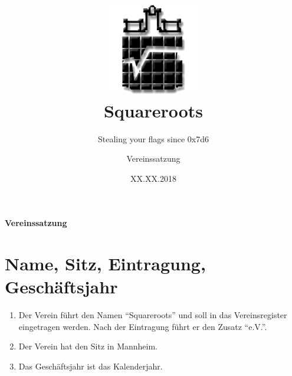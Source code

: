 \documentclass[a4paper,ngerman]{scrartcl}
\begin{document}
\title{\includegraphics[width=0.3\textwidth]{sqrts}\\[1cm]Squareroots}
\subtitle{Stealing your flags since 0x7d6}
\date{XX.XX.2018}
\author{Vereinssatzung}

\maketitle
\pagebreak

\setcounter{tocdepth}{1}
\listoftodos
\pagebreak


\textbf{\huge{}Vereinssatzung}{\huge \par}

\section{Name, Sitz, Eintragung, Geschäftsjahr}
\begin{enumerate}
\item Der Verein führt den Namen "`Squareroots"' und soll in das Vereinsregister eingetragen werden. Nach der Eintragung führt er den Zusatz "`e.V."'.
\item Der Verein hat den Sitz in Mannheim.
\item Das Geschäftsjahr ist das Kalenderjahr.
\end{enumerate}
\end{document}
